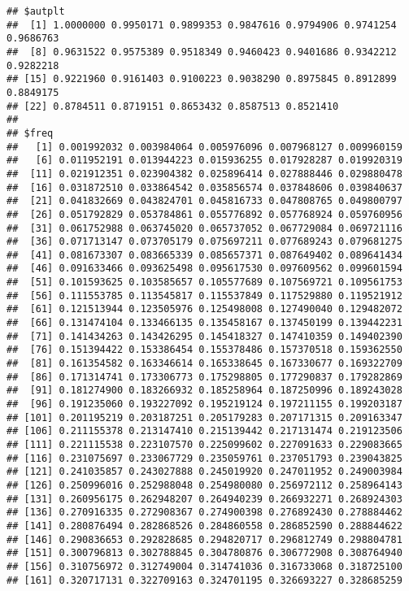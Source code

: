 \documentclass[]{article}
\begin{document}
\begin{verbatim}
## $autplt
##  [1] 1.0000000 0.9950171 0.9899353 0.9847616 0.9794906 0.9741254 0.9686763
##  [8] 0.9631522 0.9575389 0.9518349 0.9460423 0.9401686 0.9342212 0.9282218
## [15] 0.9221960 0.9161403 0.9100223 0.9038290 0.8975845 0.8912899 0.8849175
## [22] 0.8784511 0.8719151 0.8653432 0.8587513 0.8521410
## 
## $freq
##   [1] 0.001992032 0.003984064 0.005976096 0.007968127 0.009960159
##   [6] 0.011952191 0.013944223 0.015936255 0.017928287 0.019920319
##  [11] 0.021912351 0.023904382 0.025896414 0.027888446 0.029880478
##  [16] 0.031872510 0.033864542 0.035856574 0.037848606 0.039840637
##  [21] 0.041832669 0.043824701 0.045816733 0.047808765 0.049800797
##  [26] 0.051792829 0.053784861 0.055776892 0.057768924 0.059760956
##  [31] 0.061752988 0.063745020 0.065737052 0.067729084 0.069721116
##  [36] 0.071713147 0.073705179 0.075697211 0.077689243 0.079681275
##  [41] 0.081673307 0.083665339 0.085657371 0.087649402 0.089641434
##  [46] 0.091633466 0.093625498 0.095617530 0.097609562 0.099601594
##  [51] 0.101593625 0.103585657 0.105577689 0.107569721 0.109561753
##  [56] 0.111553785 0.113545817 0.115537849 0.117529880 0.119521912
##  [61] 0.121513944 0.123505976 0.125498008 0.127490040 0.129482072
##  [66] 0.131474104 0.133466135 0.135458167 0.137450199 0.139442231
##  [71] 0.141434263 0.143426295 0.145418327 0.147410359 0.149402390
##  [76] 0.151394422 0.153386454 0.155378486 0.157370518 0.159362550
##  [81] 0.161354582 0.163346614 0.165338645 0.167330677 0.169322709
##  [86] 0.171314741 0.173306773 0.175298805 0.177290837 0.179282869
##  [91] 0.181274900 0.183266932 0.185258964 0.187250996 0.189243028
##  [96] 0.191235060 0.193227092 0.195219124 0.197211155 0.199203187
## [101] 0.201195219 0.203187251 0.205179283 0.207171315 0.209163347
## [106] 0.211155378 0.213147410 0.215139442 0.217131474 0.219123506
## [111] 0.221115538 0.223107570 0.225099602 0.227091633 0.229083665
## [116] 0.231075697 0.233067729 0.235059761 0.237051793 0.239043825
## [121] 0.241035857 0.243027888 0.245019920 0.247011952 0.249003984
## [126] 0.250996016 0.252988048 0.254980080 0.256972112 0.258964143
## [131] 0.260956175 0.262948207 0.264940239 0.266932271 0.268924303
## [136] 0.270916335 0.272908367 0.274900398 0.276892430 0.278884462
## [141] 0.280876494 0.282868526 0.284860558 0.286852590 0.288844622
## [146] 0.290836653 0.292828685 0.294820717 0.296812749 0.298804781
## [151] 0.300796813 0.302788845 0.304780876 0.306772908 0.308764940
## [156] 0.310756972 0.312749004 0.314741036 0.316733068 0.318725100
## [161] 0.320717131 0.322709163 0.324701195 0.326693227 0.328685259

\end{verbatim}
\end{document}
